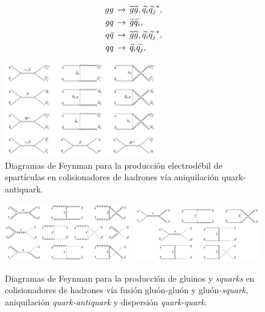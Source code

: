 \begin{align}
  gg \, &\rightarrow \, \widetilde{g}\widetilde{g}, \widetilde{q_i}\widetilde{q_j}^{*}, \label{eq:gg} \\
  gq \, &\rightarrow \, \widetilde{g}\widetilde{q_i}, \label{eq:gq} \\
  q\bar{q} \, &\rightarrow \, \widetilde{g}\widetilde{g}, \widetilde{q_i}\widetilde{q_j}^{*}, \label{eq:qqbar} \\
  qq \, &\rightarrow \, \widetilde{q_i}\widetilde{q_j}, \label{eq:qq}
\end{align}


\begin{figure}[!htb]
  \centering \includegraphics[width=0.6\textwidth]{figures/figure_101}
  \caption{Diagramas de Feynman para la producción electrodébil de spartículas
    en colisionadores de hadrones vía aniquilación quark-antiquark.}
  \label{fig:ewkprod}
\end{figure}

\begin{figure}[!htb]
  \centering

  \includegraphics[width=0.49\textwidth]{figures/figure_102}
  \includegraphics[width=0.49\textwidth]{figures/figure_103}

  \caption{Diagramas de Feynman para la producción de gluinos y \emph{squarks} en
    colisionadores de hadrones vía fusión gluón-gluón y gluón-\emph{squark},
    aniquilación \emph{quark-antiquark} y dispersión \emph{quark-quark}.}
  \label{fig:strongprod}
\end{figure}

